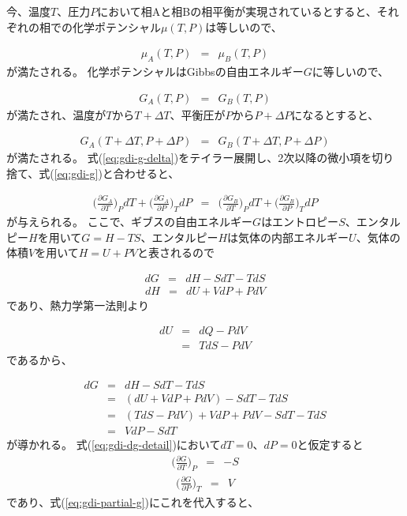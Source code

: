 \documentclass[titlepage]{jsreport}
\begin{document}
今、温度$T$、圧力$P$において相Aと相Bの相平衡が実現されているとすると、それぞれの相での化学ポテンシャル$\mu(T,P)$は等しいので、

\large
\begin{eqnarray}
\mu_A(T,P) &=& \mu_B(T,P) \label{eq:gdi-mu}
\end{eqnarray}
\normalsize
が満たされる。
化学ポテンシャルはGibbsの自由エネルギー$G$に等しいので、

\large
\begin{eqnarray}
G_A(T,P) &=& G_B(T,P) \label{eq:gdi-g}
\end{eqnarray}
\normalsize
が満たされ、温度が$T$から$T+\Delta{T}$、平衡圧が$P$から$P+\Delta{P}$になるとすると、

\large
\begin{eqnarray}
G_A(T+\Delta{T},P+\Delta{P}) &=& G_B(T+\Delta{T},P+\Delta{P}) \label{eq:gdi-g-delta}
\end{eqnarray}
\normalsize
が満たされる。
式(\ref{eq:gdi-g-delta})をテイラー展開し、2次以降の微小項を切り捨て、式(\ref{eq:gdi-g})と合わせると、

\large
\begin{eqnarray}
\bigg(\frac{\partial{G_A}}{\partial{T}}\bigg)_PdT + \bigg(\frac{\partial{G_A}}{\partial{P}}\bigg)_TdP &=& \bigg(\frac{\partial{G_B}}{\partial{T}}\bigg)_PdT + \bigg(\frac{\partial{G_B}}{\partial{P}}\bigg)_TdP \label{eq:gdi-partial-g}
\end{eqnarray}
\normalsize
が与えられる。
ここで、ギブスの自由エネルギー$G$はエントロピー$S$、エンタルピー$H$を用いて$G=H-TS$、エンタルピー$H$は気体の内部エネルギー$U$、気体の体積$V$を用いて$H=U+PV$と表されるので

\large
\begin{eqnarray}
dG &=& dH-SdT-TdS \label{eq:gdi-dg}
\end{eqnarray}
\begin{eqnarray}
dH &=& dU+VdP+PdV \label{eq:gdi-dh}
\end{eqnarray}
\normalsize
であり、熱力学第一法則より

\large
\begin{eqnarray}
dU &=& dQ-PdV \nonumber \\
   &=& TdS-PdV \label{eq:thermodynamics}
\end{eqnarray}
\normalsize
であるから、

\large
\begin{eqnarray}
dG &=& dH-SdT-TdS \nonumber\\
   &=& (dU+VdP+PdV)-SdT-TdS \nonumber\\
   &=& {(TdS-PdV)+VdP+PdV}-SdT-TdS \nonumber\\
   &=& VdP-SdT \label{eq:gdi-dg-detail}
\end{eqnarray}
\normalsize
が導かれる。
式(\ref{eq:gdi-dg-detail})において$dT=0$、$dP=0$と仮定すると
\large
\begin{eqnarray}
\bigg(\frac{\partial{G}}{\partial{T}}\bigg)_P &=& -S \label{eq:gdi-dg-dt}
\end{eqnarray}
\begin{eqnarray}
\bigg(\frac{\partial{G}}{\partial{P}}\bigg)_T &=& V \label{eq:gdi-dg-dp}
\end{eqnarray}
\normalsize
であり、式(\ref{eq:gdi-partial-g})にこれを代入すると、
\end{document}
